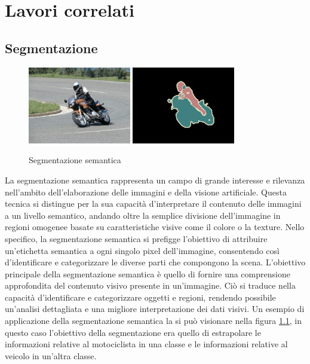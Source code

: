
\chapter{Lavori correlati} \label{chap:related_works}
\section{Segmentazione} \label{sec:segmentazione} 

\begin{figure}[H]
  \begin{center}
    \includegraphics[width=0.4\textwidth]{Immagini/segmantion_example_image.png}
    \includegraphics[width=0.4\textwidth]{Immagini/segmantion_example_mask.png}
  \end{center}
  \caption{Segmentazione semantica}
  \label{fig:segmentazione}
\end{figure}

La segmentazione semantica rappresenta un campo di grande interesse e rilevanza
nell'ambito dell'elaborazione delle immagini e della visione artificiale. Questa
tecnica si distingue per la sua capacità d'interpretare il contenuto delle
immagini a un livello semantico, andando oltre la semplice divisione
dell'immagine in regioni omogenee basate su caratteristiche visive come il
colore o la texture. Nello specifico, la segmentazione semantica si prefigge
l'obiettivo di attribuire un'etichetta semantica a ogni singolo pixel
dell'immagine, consentendo così d'identificare e categorizzare le diverse parti
che compongono la scena.  L'obiettivo principale della segmentazione semantica è
quello di fornire una comprensione approfondita del contenuto visivo presente in
un'immagine. Ciò si traduce nella capacità d'identificare e categorizzare
oggetti e regioni, rendendo possibile un'analisi dettagliata e una migliore
interpretazione dei dati visivi.
Un esempio di applicazione della segmentazione semantica la si pu\`o visionare
nella figura \ref{fig:segmentazione}, in questo caso l'obiettivo della segmentazione era quello di 
estrapolare le informazioni relative al motociclista in una classe e le informazioni relative 
al veicolo in un'altra classe.



